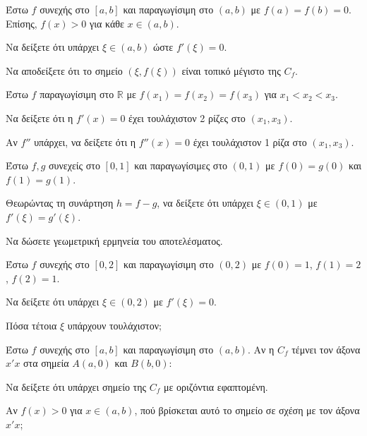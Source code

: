\documentclass[11pt,a4paper,modern]{FFExercises}
\begin{document}
\askhsh
Έστω $f$ συνεχής στο $[a, b]$ και παραγωγίσιμη στο $(a, b)$ με $f(a) = f(b) = 0$. Επίσης, $f(x) > 0$ για κάθε $x \in (a, b)$.
\begin{alist}
  \item Να δείξετε ότι υπάρχει $\xi \in (a, b)$ ώστε $f'(\xi) = 0$.
  \item Να αποδείξετε ότι το σημείο $(\xi, f(\xi))$ είναι τοπικό μέγιστο της $C_f$.
\end{alist}

\askhsh
Έστω $f$ παραγωγίσιμη στο $\mathbb{R}$ με $f(x_1) = f(x_2) = f(x_3)$ για $x_1 < x_2 < x_3$.
\begin{alist}
  \item Να δείξετε ότι η $f'(x) = 0$ έχει τουλάχιστον 2 ρίζες στο $(x_1, x_3)$.
  \item Αν $f''$ υπάρχει, να δείξετε ότι η $f''(x) = 0$ έχει τουλάχιστον 1 ρίζα στο $(x_1, x_3)$.
\end{alist}

\askhsh
Έστω $f, g$ συνεχείς στο $[0, 1]$ και παραγωγίσιμες στο $(0, 1)$ με $f(0) = g(0)$ και $f(1) = g(1)$.
\begin{alist}
  \item Θεωρώντας τη συνάρτηση $h = f - g$, να δείξετε ότι υπάρχει $\xi \in (0, 1)$ με $f'(\xi) = g'(\xi)$.
  \item Να δώσετε γεωμετρική ερμηνεία του αποτελέσματος.
\end{alist}

\askhsh
Έστω $f$ συνεχής στο $[0, 2]$ και παραγωγίσιμη στο $(0, 2)$ με $f(0) = 1$, $f(1) = 2$, $f(2) = 1$.
\begin{alist}
  \item Να δείξετε ότι υπάρχει $\xi \in (0, 2)$ με $f'(\xi) = 0$.
  \item Πόσα τέτοια $\xi$ υπάρχουν τουλάχιστον;
\end{alist}

\askhsh
Έστω $f$ συνεχής στο $[a, b]$ και παραγωγίσιμη στο $(a, b)$. Αν η $C_f$ τέμνει τον άξονα $x'x$ στα σημεία $A(a, 0)$ και $B(b, 0)$:
\begin{alist}
  \item Να δείξετε ότι υπάρχει σημείο της $C_f$ με οριζόντια εφαπτομένη.
  \item Αν $f(x) > 0$ για $x \in (a, b)$, πού βρίσκεται αυτό το σημείο σε σχέση με τον άξονα $x'x$;
\end{alist}

\end{document}
